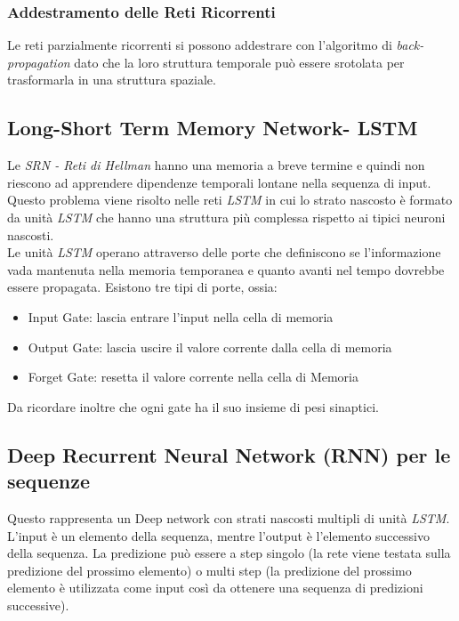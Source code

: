 \documentclass[12pt, a4paper]{article}
\begin{document}
\subsubsection{Addestramento delle Reti Ricorrenti}
Le reti parzialmente ricorrenti si possono addestrare con l'algoritmo di \textit{back-propagation} dato che la loro struttura temporale può essere srotolata per trasformarla in una struttura spaziale.

\subsection{Long-Short Term Memory Network- LSTM}
Le \textit{SRN - Reti di Hellman} hanno una memoria a breve termine e quindi non riescono ad apprendere dipendenze temporali lontane nella sequenza di input. Questo problema viene risolto nelle reti \textit{LSTM} in cui lo strato nascosto è formato da unità \textit{LSTM} che hanno una struttura più complessa rispetto ai tipici neuroni nascosti.\\
Le unità \textit{LSTM} operano attraverso delle porte che definiscono se l'informazione vada mantenuta nella memoria temporanea e quanto avanti nel tempo dovrebbe essere propagata. Esistono tre tipi di porte, ossia:
\begin{itemize}
    \item Input Gate: lascia entrare l'input nella cella di memoria
    \item Output Gate: lascia uscire il valore corrente dalla cella di memoria
    \item Forget Gate: resetta il valore corrente nella cella di Memoria
\end{itemize}

Da ricordare inoltre che ogni gate ha il suo insieme di pesi sinaptici.

\subsection{Deep Recurrent Neural Network (RNN) per le sequenze}
Questo rappresenta un Deep network con strati nascosti multipli di unità \textit{LSTM}. L'input è un elemento della sequenza, mentre l'output è l'elemento successivo della sequenza. La predizione può essere a step singolo (la rete viene testata sulla predizione del prossimo elemento) o multi step (la predizione del prossimo elemento è utilizzata come input così da ottenere una sequenza di predizioni successive).
\end{document}
